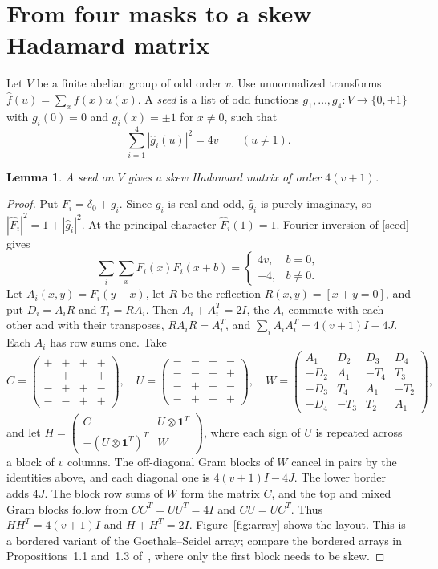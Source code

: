 \documentclass[11pt]{article}
\newtheorem{lemma}[theorem]{Lemma}
\theoremstyle{remark}
\newcommand{\one}{\mathbf 1}
\begin{document}
\section{From four masks to a skew Hadamard matrix}\label{sec:array}
Let $V$ be a finite abelian group of odd order $v$. Use unnormalized transforms $\widehat f(u)=\sum_x f(x)u(x)$. A \emph{seed} is a list of odd functions $g_1,\dots,g_4\colon V\to\{0,\pm1\}$ with $g_i(0)=0$ and $g_i(x)=\pm1$ for $x\ne0$, such that
\begin{equation}\label{seed}
\sum_{i=1}^4|\widehat g_i(u)|^2=4v\qquad(u\ne1).
\end{equation}

\begin{lemma}\label{array}
A seed on $V$ gives a skew Hadamard matrix of order $4(v+1)$.
\end{lemma}

\begin{proof}
Put $F_i=\delta_0+g_i$. Since $g_i$ is real and odd, $\widehat g_i$ is purely imaginary, so $|\widehat F_i|^2=1+|\widehat g_i|^2$. At the principal character $\widehat F_i(1)=1$. Fourier inversion of \eqref{seed} gives
\[
\sum_i\sum_xF_i(x)F_i(x+b)=\begin{cases}4v,&b=0,\\-4,&b\ne0.\end{cases}
\]
Let $A_i(x,y)=F_i(y-x)$, let $R$ be the reflection $R(x,y)=[x+y=0]$, and put $D_i=A_iR$ and $T_i=RA_i$. Then $A_i+A_i^T=2I$, the $A_i$ commute with each other and with their transposes, $RA_iR=A_i^T$, and $\sum_iA_iA_i^T=4(v+1)I-4J$. Each $A_i$ has row sums one. Take
\[
 C=\begin{pmatrix}+&+&+&+\\-&+&-&+\\-&+&+&-\\-&-&+&+\end{pmatrix},\quad
 U=\begin{pmatrix}-&-&-&-\\-&-&+&+\\-&+&+&-\\-&+&-&+\end{pmatrix},\quad
 W=\begin{pmatrix}
 A_1&D_2&D_3&D_4\\
 -D_2&A_1&-T_4&T_3\\
 -D_3&T_4&A_1&-T_2\\
 -D_4&-T_3&T_2&A_1
 \end{pmatrix},
\]
and let $H=\begin{pmatrix}C&U\otimes\one^T\\-(U\otimes\one^T)^T&W\end{pmatrix}$, where each sign of $U$ is repeated across a block of $v$ columns. The off-diagonal Gram blocks of $W$ cancel in pairs by the identities above, and each diagonal one is $4(v+1)I-4J$. The lower border adds $4J$. The block row sums of $W$ form the matrix $C$, and the top and mixed Gram blocks follow from $CC^T=UU^T=4I$ and $CU=UC^T$. Thus $HH^T=4(v+1)I$ and $H+H^T=2I$. Figure~\ref{fig:array} shows the layout. This is a bordered variant of the Goethals--Seidel array; compare the bordered arrays in Propositions~1.1 and~1.3 of~\cite{MX}, where only the first block needs to be skew.
\end{proof}
\end{document}
